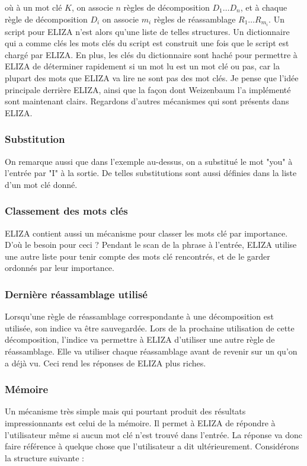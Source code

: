 \documentclass[11pt,a4paper]{report}
\begin{document}
  où à un mot clé $K$, on associe $n$ règles de décomposition $D_{1} \ldots D_{n}$, et à 
  chaque règle de décomposition $D_{i}$ on associe $m_{i}$ règles de réassamblage 
  $R_{1} \ldots R_{m_{i}}$. Un script pour ELIZA 
  n'est alors qu'une liste de telles structures. Un dictionnaire qui a comme clés 
  les mots clés du script est construit une fois que le script est chargé par ELIZA. 
  En plus, les clés du dictionnaire sont haché pour permettre à ELIZA de déterminer 
  rapidement si un mot lu est un mot clé ou pas, car la plupart des mots que ELIZA va lire 
  ne sont pas des mot clés. Je pense que l'idée principale derrière ELIZA, ainsi 
  que la façon dont Weizenbaum l'a implémenté sont maintenant clairs. Regardons 
  d'autres mécanismes qui sont présents dans ELIZA.

  \subsubsection*{Substitution}
  On remarque aussi que dans l'exemple au-dessus, on a substitué le mot "you" à l'entrée par "I"
  à la sortie. De telles substitutions sont aussi définies dans la liste d'un mot clé donné.  
  
  \subsubsection*{Classement des mots clés}
  ELIZA contient aussi un mécanisme pour classer les mots clé par importance. D'où le besoin 
  pour ceci ?  Pendant le scan de la phrase à l'entrée, 
  ELIZA utilise une autre liste pour tenir compte des mots clé rencontrés, et de le garder 
  ordonnés par leur importance.
  
  \subsubsection*{Dernière réassamblage utilisé}
  Lorsqu'une règle de réassamblage correspondante à une décomposition 
  est utilisée, son indice va être sauvegardée. 
  Lors de la prochaine utilisation de cette décomposition, l'indice 
  va permettre à ELIZA d'utiliser une autre règle de réassamblage. 
  Elle va utiliser chaque réassamblage avant de revenir sur un qu'on a déjà vu. 
  Ceci rend les réponses de ELIZA plus riches.
  
  \subsubsection*{Mémoire}
  Un mécanisme très simple mais qui pourtant produit des résultats impressionnants est celui 
  de la mémoire. Il permet à ELIZA de répondre à l'utilisateur même si aucun mot clé n'est trouvé 
  dans l'entrée. La réponse va donc faire référence à quelque chose que l'utilisateur a dit 
  ultérieurement. Considérons la structure suivante : 
\end{document}
